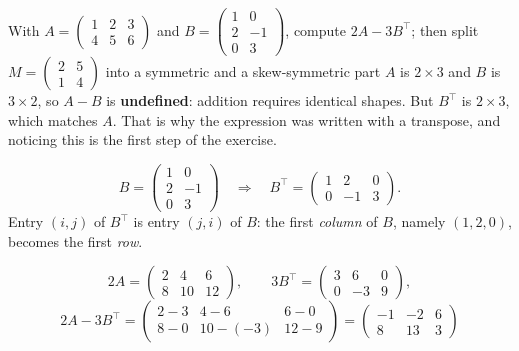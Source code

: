 \begin{worked}{With $A=\begin{pmatrix}1&2&3\\4&5&6\end{pmatrix}$ and $B=\begin{pmatrix}1&0\\2&-1\\0&3\end{pmatrix}$, compute $2A-3B^{\!\top}$; then split $M=\begin{pmatrix}2&5\\1&4\end{pmatrix}$ into a symmetric and a skew-symmetric part}
$A$ is $2\times3$ and $B$ is $3\times2$, so $A-B$ is \textbf{undefined}:
addition requires identical shapes. But $B^{\!\top}$ is $2\times3$, which
matches $A$. That is why the expression was written with a transpose, and
noticing this is the first step of the exercise.

\[
  B=\begin{pmatrix}1&0\\2&-1\\0&3\end{pmatrix}
  \quad\Longrightarrow\quad
  B^{\!\top}=\begin{pmatrix}1&2&0\\0&-1&3\end{pmatrix} .
\]
Entry $(i,j)$ of $B^{\!\top}$ is entry $(j,i)$ of $B$: the first
\emph{column} of $B$, namely $(1,2,0)$, becomes the first \emph{row}.

\[
  2A=\begin{pmatrix}2&4&6\\8&10&12\end{pmatrix},
  \qquad
  3B^{\!\top}=\begin{pmatrix}3&6&0\\0&-3&9\end{pmatrix},
\]
\[
  2A-3B^{\!\top}
  =\begin{pmatrix}2-3&4-6&6-0\\8-0&10-(-3)&12-9\end{pmatrix}
  =\boxed{\begin{pmatrix}-1&-2&6\\8&13&3\end{pmatrix}}
\]


\end{worked}
